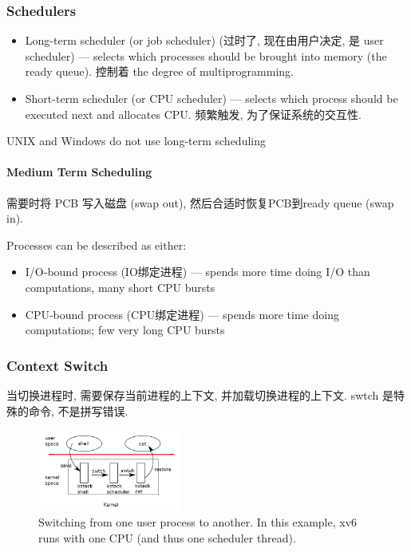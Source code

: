 \subsubsection{Schedulers}
\begin{itemize}
    \item Long-term scheduler (or job scheduler) (过时了, 现在由用户决定, 是 user scheduler) --- selects which processes should be brought into memory (the ready queue). 控制着 the degree of multiprogramming. 
    \item Short-term scheduler (or CPU scheduler) --- selects which process should be executed next and allocates CPU. 频繁触发, 为了保证系统的交互性. 
\end{itemize}
UNIX and Windows do not use long-term scheduling

\paragraph{Medium Term Scheduling} 需要时将 PCB 写入磁盘 (swap out), 然后合适时恢复PCB到ready queue (swap in). 

Processes can be described as either:
\begin{itemize}
    \item I/O-bound process (IO绑定进程) --- spends more time doing I/O than
    computations, many short CPU bursts
    \item CPU-bound process (CPU绑定进程) --- spends more time doing
    computations; few very long CPU bursts
\end{itemize}

\subsubsection{Context Switch}
当切换进程时, 需要保存当前进程的上下文, 并加载切换进程的上下文. swtch 是特殊的命令, 不是拼写错误.  %

\begin{figure}[!htb]
    \centering
    \includegraphics[width=0.42\textwidth]{pic/oS3/context switch.png}
    \caption{Switching from one user process to another. In this example, xv6 runs with one CPU (and thus one scheduler thread).}
\end{figure}

